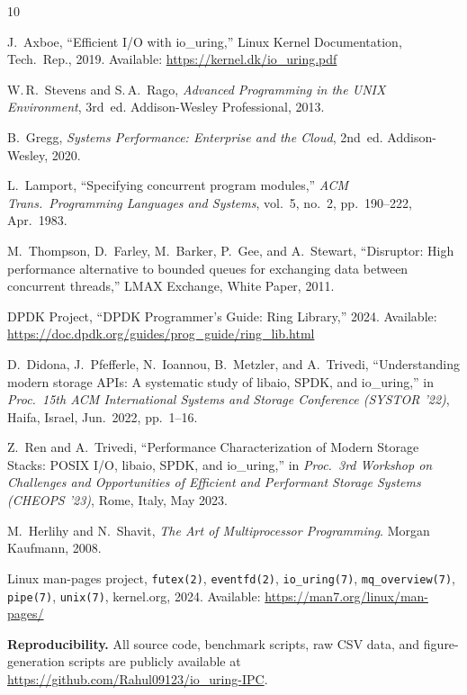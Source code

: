 \documentclass[10pt,conference]{IEEEtran}
\begin{document}
\small
\begin{thebibliography}{10}

J.~Axboe,
``Efficient I/O with io\_uring,''
Linux Kernel Documentation, Tech.\ Rep., 2019.
Available: \url{https://kernel.dk/io_uring.pdf}

W.\,R.~Stevens and S.\,A.~Rago,
\textit{Advanced Programming in the UNIX Environment}, 3rd~ed.
Addison-Wesley Professional, 2013.

B.~Gregg,
\textit{Systems Performance: Enterprise and the Cloud}, 2nd~ed.
Addison-Wesley, 2020.

L.~Lamport,
``Specifying concurrent program modules,''
\textit{ACM Trans.\ Programming Languages and Systems},
vol.~5, no.~2, pp.~190--222, Apr.\ 1983.

M.~Thompson, D.~Farley, M.~Barker, P.~Gee, and A.~Stewart,
``Disruptor: High performance alternative to bounded queues for exchanging
data between concurrent threads,''
LMAX Exchange, White Paper, 2011.

DPDK Project,
``DPDK Programmer's Guide: Ring Library,'' 2024.
Available: \url{https://doc.dpdk.org/guides/prog_guide/ring_lib.html}

D.~Didona, J.~Pfefferle, N.~Ioannou, B.~Metzler, and A.~Trivedi,
``Understanding modern storage APIs: A systematic study of libaio, SPDK,
and io\_uring,''
in \textit{Proc.\ 15th ACM International Systems and Storage Conference (SYSTOR '22)},
Haifa, Israel, Jun.\ 2022, pp.~1--16.

Z.~Ren and A.~Trivedi,
``Performance Characterization of Modern Storage Stacks: POSIX I/O, libaio, SPDK, and io\_uring,''
in \textit{Proc.\ 3rd Workshop on Challenges and Opportunities of Efficient and Performant Storage Systems (CHEOPS '23)},
Rome, Italy, May 2023.

M.~Herlihy and N.~Shavit,
\textit{The Art of Multiprocessor Programming}.
Morgan Kaufmann, 2008.

Linux man-pages project,
\texttt{futex(2)}, \texttt{eventfd(2)}, \texttt{io\_uring(7)},
\texttt{mq\_overview(7)}, \texttt{pipe(7)}, \texttt{unix(7)},
kernel.org, 2024.
Available: \url{https://man7.org/linux/man-pages/}

\end{thebibliography}

\vspace{4pt}
\noindent\textbf{Reproducibility.}  All source code, benchmark scripts, raw CSV data, and
figure-generation scripts are publicly available at \url{https://github.com/Rahul09123/io_uring-IPC}.
\end{document}
